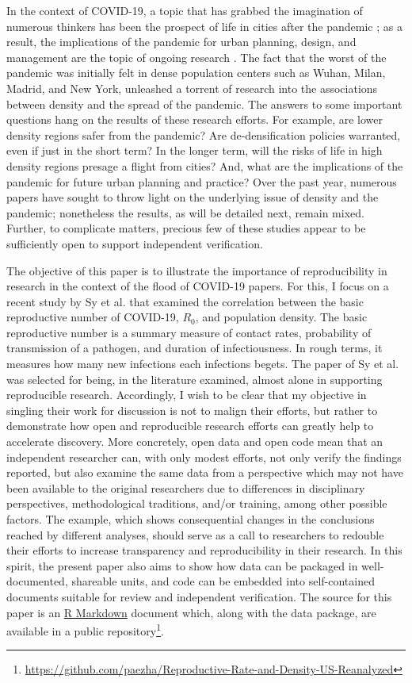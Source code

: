 \documentclass[preprint, 3p,
authoryear]{elsarticle} %
\begin{document}
In the context of COVID-19, a topic that has grabbed the imagination of
numerous thinkers has been the prospect of life in cities after the
pandemic \citep[e.g.,][]{Florida2020how}; as a result, the implications
of the pandemic for urban planning, design, and management are the topic
of ongoing research \citep[e.g.,][]{Sharifi2020covid}. The fact that the
worst of the pandemic was initially felt in dense population centers
such as Wuhan, Milan, Madrid, and New York, unleashed a torrent of
research into the associations between density and the spread of the
pandemic. The answers to some important questions hang on the results of
these research efforts. For example, are lower density regions safer
from the pandemic? Are de-densification policies warranted, even if just
in the short term? In the longer term, will the risks of life in high
density regions presage a flight from cities? And, what are the
implications of the pandemic for future urban planning and practice?
Over the past year, numerous papers have sought to throw light on the
underlying issue of density and the pandemic; nonetheless the results,
as will be detailed next, remain mixed. Further, to complicate matters,
precious few of these studies appear to be sufficiently open to support
independent verification.

The objective of this paper is to illustrate the importance of
reproducibility in research in the context of the flood of COVID-19
papers. For this, I focus on a recent study by Sy et al.
\citeyearpar{Sy2021population} that examined the correlation between the
basic reproductive number of COVID-19, \(R_0\), and population density.
The basic reproductive number is a summary measure of contact rates,
probability of transmission of a pathogen, and duration of
infectiousness. In rough terms, it measures how many new infections each
infections begets. The paper of Sy et al. \citeyearpar{Sy2021population}
was selected for being, in the literature examined, almost alone in
supporting reproducible research. Accordingly, I wish to be clear that
my objective in singling their work for discussion is not to malign
their efforts, but rather to demonstrate how open and reproducible
research efforts can greatly help to accelerate discovery. More
concretely, open data and open code mean that an independent researcher
can, with only modest efforts, not only verify the findings reported,
but also examine the same data from a perspective which may not have
been available to the original researchers due to differences in
disciplinary perspectives, methodological traditions, and/or training,
among other possible factors. The example, which shows consequential
changes in the conclusions reached by different analyses, should serve
as a call to researchers to redouble their efforts to increase
transparency and reproducibility in their research. In this spirit, the
present paper also aims to show how data can be packaged in
well-documented, shareable units, and code can be embedded into
self-contained documents suitable for review and independent
verification. The source for this paper is an
\href{http://rmarkdown.rstudio.com}{R Markdown} document which, along
with the data package, are available in a public repository\footnote{\url{https://github.com/paezha/Reproductive-Rate-and-Density-US-Reanalyzed}}.
\end{document}
